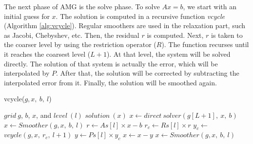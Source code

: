 The next phase of AMG is the solve phase. To solve $Ax = b$, we start with an initial guess for $x$.
%
%
The solution is computed in a recursive function \textit{vcycle} (Algorithm \ref{alg:vcycle}).
Regular smoothers are used in the relaxation part, such as Jacobi, Chebyshev, etc.
Then, the residual $r$ is computed. Next, $r$ is taken to the coarser level by using
the restriction operator ($R$).
The function recurses until it reaches the coarsest level ($L+1$). At that level,
the system will be solved directly. The solution of that system is actually the error,
which will be interpolated by $P$.
After that, the solution will be corrected by subtracting the interpolated error from it.
Finally, the solution will be smoothed again.

\begin{algorithm}[ht] 
  \caption{vcycle($g, x,\ b,\ l$)} \label{alg:vcycle} 
  \begin{algorithmic}[1]
    \Require $grid\ g$, $b$, $x$, and $level\ (l)$
    \Ensure  $solution\ (x)$
      \State $x \leftarrow direct\ solver(g[L+1],\ x,\ b)$
    \Else
      \State $x \leftarrow Smoother(g, x,\ b,\ l)$
      \State $r \leftarrow As[l] \times x - b$
      \State $r_c \leftarrow Rs[l] \times r$
      \State $y_c \leftarrow$ $vcycle(g, x,\ r_c,\ l+1)$
      \State $y \leftarrow Ps[l] \times y_c$
      \State $x \leftarrow x - y$
      \State $x \leftarrow Smoother(g, x,\ b,\ l)$
    \EndIf
  \end{algorithmic}
\end{algorithm}

